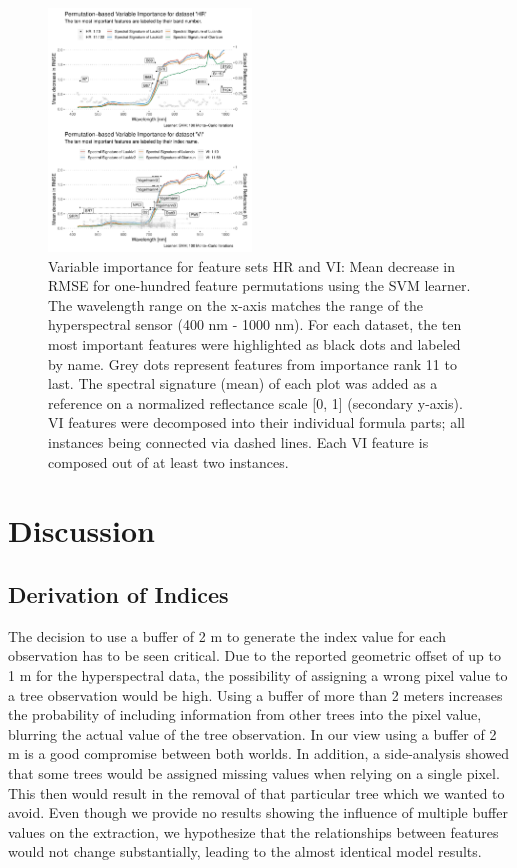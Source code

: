 \documentclass[letterpaper, peerreview]{IEEEtran}
\begin{document}
\begin{figure} [t!]
	\centering
	\begin{center}
		\includegraphics[width=0.48\textwidth] {fi-permut-vi-hr-1.pdf}
		\caption{Variable importance for feature sets HR and VI: Mean decrease in RMSE for one-hundred feature permutations using the SVM learner. The wavelength range on the x-axis matches the range of the hyperspectral sensor (400 nm - 1000 nm). For each dataset, the ten most important features were highlighted as black dots and labeled by name. Grey dots represent features from importance rank 11 to last. The spectral signature (mean) of each plot was added as a reference on a normalized reflectance scale [0, 1] (secondary y-axis). VI features were decomposed into their individual formula parts; all instances being connected via dashed lines. Each VI feature is composed out of at least two instances.}\label{fig:fi-permut-vi-hr}
	\end{center}
\end{figure}

\section{Discussion}

\subsection{Derivation of Indices}

\noindent The decision to use a buffer of 2 m to generate the index value for each observation has to be seen critical.
Due to the reported geometric offset of up to 1 m for the hyperspectral data, the possibility of assigning a wrong pixel value to a tree observation would be high.
Using a buffer of more than 2 meters increases the probability of including information from other trees into the pixel value, blurring the actual value of the tree observation.
In our view using a buffer of 2 m is a good compromise between both worlds.
In addition, a side-analysis showed that some trees would be assigned missing values when relying on a single pixel.
This then would result in the removal of that particular tree which we wanted to avoid.
Even though we provide no results showing the influence of multiple buffer values on the extraction, we hypothesize that the relationships between features would not change substantially, leading to the almost identical model results.
\end{document}
